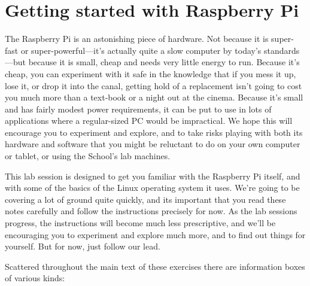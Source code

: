 \chapter{Getting started with Raspberry Pi}


The Raspberry Pi is an astonishing piece of hardware. Not because it is super-fast or super-powerful---it's actually quite a slow computer by today's standards---but because it is small, cheap and needs very little energy to run. Because it's cheap, you can experiment with it safe in the knowledge that if you mess it up, lose it, or drop it into the canal, getting hold of a replacement isn't going to cost you much more than a text-book or a night out at the cinema. Because it's small and has fairly modest power requirements, it can be put to use in lots of applications where a regular-sized PC would be impractical.  We hope this will encourage you to experiment and explore, and to take risks playing with both its hardware and software that you might be reluctant to do on your own computer or tablet, or using the School's lab machines. 

This lab session is designed to get you familiar with the Raspberry Pi itself, and with some of the basics of the Linux operating system it uses. We're going to be covering a lot of ground quite quickly, and its important that you read these notes carefully and follow the instructions precisely for now. As the lab sessions progress, the instructions will become much less prescriptive, and we'll be encouraging you to experiment and explore much more, and to find out things for yourself. But for now, just follow our lead. 

Scattered throughout the main text of these exercises there are information boxes of various kinds:
\\

